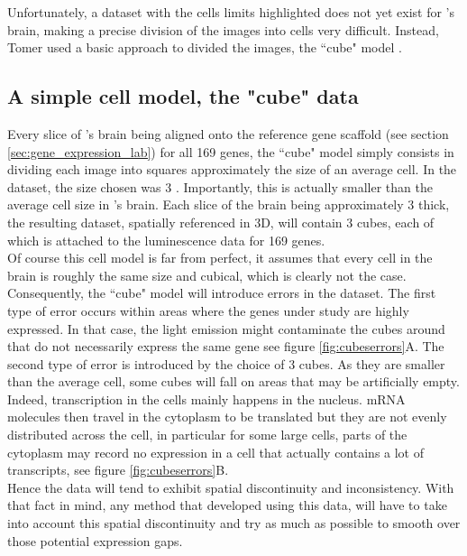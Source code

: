   Unfortunately, a dataset with the cells limits highlighted does not yet exist for \platy{}'s brain, making a precise division of the images into cells very difficult. Instead, Tomer used a basic approach to divided the images, the ``cube" model \cite{Tomer10}.


  \subsection{A simple cell model, the "cube" data}
  
  Every slice of \platy{}'s brain being aligned onto the reference gene scaffold (see section \ref{sec:gene_expression_lab}) for all 169 genes, the ``cube" model simply consists in dividing each image into squares approximately the size of an average cell. In the \platy{} dataset, the size chosen was 3 . Importantly, this is actually smaller than the average cell size in \platy{}'s brain. Each slice of the brain being approximately 3 \microm{} thick, the resulting dataset, spatially referenced in 3D, will contain 3  cubes, each of which is attached to the luminescence data for 169 genes.\\
  
  Of course this cell model is far from perfect, it assumes that every cell in the brain is roughly the same size and cubical, which is clearly not the case. Consequently, the ``cube" model will introduce errors in the dataset. The first type of error occurs within areas where the genes under study are highly expressed. In that case, the light emission might contaminate the cubes around that do not necessarily express the same gene see figure \ref{fig:cubeserrors}A. The second type of error is introduced by the choice of 3  cubes. As they are smaller than the average cell, some cubes will fall on areas that may be artificially empty. Indeed, transcription in the cells mainly happens in the nucleus. mRNA molecules then travel in the cytoplasm to be translated but they are not evenly distributed across the cell, in particular for some large cells, parts of the cytoplasm may record no expression in a cell that actually contains a lot of transcripts, see figure \ref{fig:cubeserrors}B.\\
  
  Hence the data will tend to exhibit spatial discontinuity and inconsistency. With that fact in mind, any method that developed using this data, will have to take into account this spatial discontinuity and try as much as possible to smooth over those potential expression gaps.\\
  
